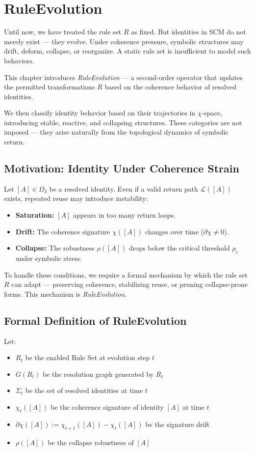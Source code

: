 \chapter{RuleEvolution}

Until now, we have treated the rule set $R$ as fixed.  
But identities in SCM do not merely exist — they evolve.  
Under coherence pressure, symbolic structures may drift, deform, collapse, or reorganize.  
A static rule set is insufficient to model such behaviors.

This chapter introduces \textit{RuleEvolution} — a second-order operator that updates the permitted transformations $R$  
based on the coherence behavior of resolved identities.

We then classify identity behavior based on their trajectories in $\chi$-space,  
introducing stable, reactive, and collapsing structures.  
These categories are not imposed — they arise naturally from the topological dynamics of symbolic return.

\section{Motivation: Identity Under Coherence Strain}

Let $[A] \in \Omega_3$ be a resolved identity.  
Even if a valid return path $\mathcal{L}([A])$ exists, repeated reuse may introduce instability:

\begin{itemize}
  \item \textbf{Saturation:} $[A]$ appears in too many return loops.
  \item \textbf{Drift:} The coherence signature $\chi([A])$ changes over time ($\partial \chi \ne 0$).
  \item \textbf{Collapse:} The robustness $\rho([A])$ drops below the critical threshold $\rho_c$ under symbolic stress.
\end{itemize}

To handle these conditions, we require a formal mechanism by which the rule set $R$ can adapt — preserving coherence, stabilizing reuse, or pruning collapse-prone forms.  
This mechanism is \textit{RuleEvolution}.

\section{Formal Definition of RuleEvolution} \label{formal-definition-of-ruleevolution}

Let:
\begin{itemize}
  \item $R_t$ be the enabled Rule Set at evolution step $t$
  \item $G(R_t)$ be the resolution graph generated by $R_t$
  \item $\Sigma_t$ be the set of resolved identities at time $t$
  \item $\chi_t([A])$ be the coherence signature of identity $[A]$ at time $t$
  \item $\partial \chi([A]) := \chi_{t+1}([A]) - \chi_t([A])$ be the signature drift
  \item $\rho([A])$ be the collapse robustness of $[A]$
\end{itemize}

